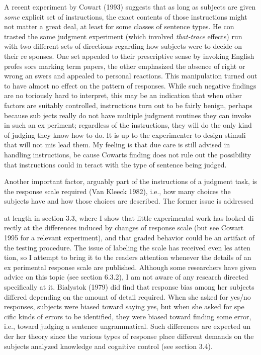 \begin{styleStandard}
A recent experiment by Cowart (1993) suggests that as long as subjects are given \textit{some}\textit{ }explicit set of instructions, the exact contents of those instructions might not matter a great deal, at least for some classes of sentence types. He con\- trasted the same judgment experiment (which involved \textit{that-trace}\textit{ }effects) run with two different sets of directions regarding how subjects were to decide on their re\- sponses. One set appealed to their prescriptive sense by invoking English profes\- sors marking term papers, the other emphasized the absence of right or wrong an\- swers and appealed to personal reactions. This manipulation turned out to have almost no effect on the pattern of responses. While such negative findings are no\- toriously hard to interpret, this may be an indication that when other factors are suitably controlled, instructions turn out to be fairly benign, perhaps because sub\- jects really do not have multiple judgment routines they can invoke in such an ex\- periment; regardless of the instructions, they will do the only kind of judging they know how to do. It is up to the experimenter to design stimuli that will not mis\- lead them. My feeling is that due care is still advised in handling instructions, be\- cause Cowart{\textquotesingle}s finding does not rule out the possibility that instructions could in\- teract with the type of sentence being judged.
\end{styleStandard}


\begin{styleStandard}
Another important factor, arguably part of the instructions of a judgment task, is the response scale required (Van Kleeck 1982), i.e., how many choices the subjects have and how those choices are described. The former issue is addressed
\end{styleStandard}


\clearpage\setcounter{page}{1}\begin{styleStandard}
at length in section 3.3, where I show that little experimental work has looked di\- rectly at the differences induced by changes of response scale (but see Cowart 1995 for a relevant experiment), and that graded behavior could be an artifact of the testing procedure. The issue of labeling the scale has received even les atten\- tion, so I attempt to bring it to the reader{\textquotesingle}s attention whenever the details of an ex\- perimental response scale are published. Although some researchers have given advice on this topic (see section 6.3.2), I am not aware of any research directed specifically at it. Bialystok (1979) did find that response bias among her subjects differed depending on the amount of detail required. When she asked for yes/no responses, subjects were biased toward saying {\textquotedbl}yes,{\textquotedbl} but when she asked for spe\- cific kinds of errors to be identified, they were biased toward finding some error, i.e., toward judging a sentence ungrammatical. Such differences are expected un\- der her theory since the various types of response place different demands on the subjects{\textquotesingle} analyzed knowledge and cognitive control (see section 3.4).
\end{styleStandard}


